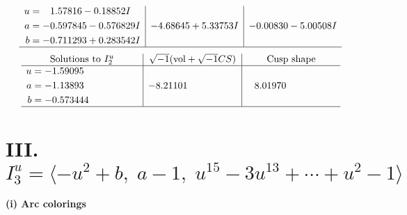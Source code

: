 \documentclass[1p]{elsarticle_modified}
\theoremstyle{definition}
\newcommand{\I}{\sqrt{-1}}
\begin{document}
$$\begin{array}{c|c|c}
\begin{aligned}
u &= \phantom{-}1.57816 - 0.18852 I \\
a &= -0.597845 - 0.576829 I \\
b &= -0.711293 + 0.283542 I\end{aligned}
 & -4.68645 + 5.33753 I & -0.00830 - 5.00508 I\\
 \hline 
 \end{array}$$\newpage$$\begin{array}{c|c|c}  
\text{Solutions to }I^u_{2}& \I (\text{vol} + \sqrt{-1}CS) & \text{Cusp shape}\\
 \hline 
\begin{aligned}
u &= -1.59095\phantom{ +0.000000I} \\
a &= -1.13893\phantom{ +0.000000I} \\
b &= -0.573444\phantom{ +0.000000I}\end{aligned}
 & -8.21101\phantom{ +0.000000I} & \phantom{-}8.01970\phantom{ +0.000000I}\\
 \hline 
 \end{array}$$\newpage\newpage\renewcommand{\arraystretch}{1}
\centering \section*{III. $I^u_{3}= \langle - u^2+b,\;a-1,\;u^{15}-3 u^{13}+\cdots+u^2-1 \rangle$}
\flushleft \textbf{(i) Arc colorings}\\
\end{document}
